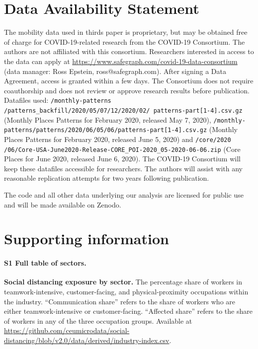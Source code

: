\documentclass[10pt,letterpaper]{article}
\begin{document}
\section*{Data Availability Statement}
The mobility data used in thirds paper \cite{SafeGraph2020-gn} is proprietary, but may be obtained free of charge for COVID-19-related research from the COVID-19 Consortium. The authors are not affiliated with this consortium. Researchers interested in access to the data can apply at \url{https://www.safegraph.com/covid-19-data-consortium} (data manager: Ross Epstein, ross@safegraph.com). After signing a Data Agreement, access is granted within a few days. The Consortium does not require coauthorship and does not review or approve research results before publication. Datafiles used: \texttt{/monthly-patterns /patterns\_backfill/2020/05/07/12/2020/02/ patterns-part[1-4].csv.gz} (Monthly Places Patterns for February 2020, released May 7, 2020), \texttt{/monthly-patterns/patterns/2020/06/05/06/patterns-part[1-4].csv.gz} (Monthly Places Patterns for February 2020, released June 5, 2020) and \texttt{/core/2020 /06/Core-USA-June2020-Release-CORE\_POI-2020\_05-2020-06-06.zip} (Core Places for June 2020, released June 6, 2020). The COVID-19 Consortium will keep these datafiles accessible for researchers. The authors will assist with any reasonable replication attempts for two years following publication.

The code and all other data underlying our analysis are licensed for public use and will be made available on Zenodo. 

\section*{Supporting information}

\paragraph*{S1 Full table of sectors.}
\label{S1_File}
{\bf Social distancing exposure by sector.} The percentage share of workers in teamwork-intensive, customer-facing, and physical-proximity occupations within the industry. ``Communication share'' refers to the share of workers who are either teamwork-intensive or customer-facing. ``Affected share'' refers to the share of workers in any of the three occupation groups. Available at \url{https://github.com/ceumicrodata/social-distancing/blob/v2.0/data/derived/industry-index.csv}.
\end{document}
